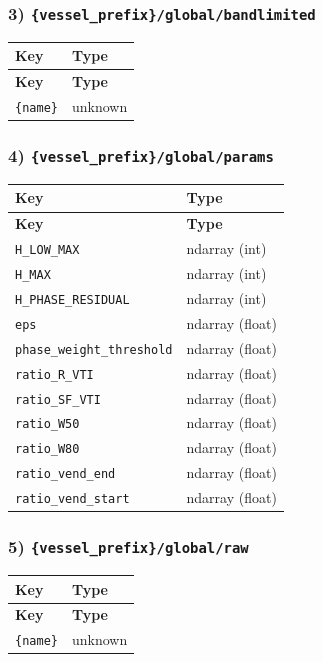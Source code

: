 \documentclass[11pt]{article}
\begin{document}
\subsubsection*{3) \texttt{\{vessel\_\allowbreak{}prefix\}/\allowbreak{}global/\allowbreak{}bandlimited}}
\begin{longtable}{|p{}|p{}|}
\hline
\textbf{Key} & \textbf{Type} \\ \hline
\endfirsthead
\hline
\textbf{Key} & \textbf{Type} \\ \hline
\endhead
\texttt{\{name\}} & unknown \\ \hline
\end{longtable}

\subsubsection*{4) \texttt{\{vessel\_\allowbreak{}prefix\}/\allowbreak{}global/\allowbreak{}params}}
\begin{longtable}{|p{}|p{}|}
\hline
\textbf{Key} & \textbf{Type} \\ \hline
\endfirsthead
\hline
\textbf{Key} & \textbf{Type} \\ \hline
\endhead
\texttt{H\_\allowbreak{}LOW\_\allowbreak{}MAX} & ndarray (int) \\ \hline
\texttt{H\_\allowbreak{}MAX} & ndarray (int) \\ \hline
\texttt{H\_\allowbreak{}PHASE\_\allowbreak{}RESIDUAL} & ndarray (int) \\ \hline
\texttt{eps} & ndarray (float) \\ \hline
\texttt{phase\_\allowbreak{}weight\_\allowbreak{}threshold} & ndarray (float) \\ \hline
\texttt{ratio\_\allowbreak{}R\_\allowbreak{}VTI} & ndarray (float) \\ \hline
\texttt{ratio\_\allowbreak{}SF\_\allowbreak{}VTI} & ndarray (float) \\ \hline
\texttt{ratio\_\allowbreak{}W50} & ndarray (float) \\ \hline
\texttt{ratio\_\allowbreak{}W80} & ndarray (float) \\ \hline
\texttt{ratio\_\allowbreak{}vend\_\allowbreak{}end} & ndarray (float) \\ \hline
\texttt{ratio\_\allowbreak{}vend\_\allowbreak{}start} & ndarray (float) \\ \hline
\end{longtable}

\subsubsection*{5) \texttt{\{vessel\_\allowbreak{}prefix\}/\allowbreak{}global/\allowbreak{}raw}}
\begin{longtable}{|p{}|p{}|}
\hline
\textbf{Key} & \textbf{Type} \\ \hline
\endfirsthead
\hline
\textbf{Key} & \textbf{Type} \\ \hline
\endhead
\texttt{\{name\}} & unknown \\ \hline
\end{longtable}
\end{document}
